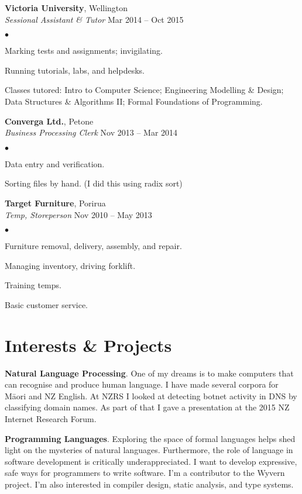 \documentclass[margin,line]{res}
\newenvironment{list2}{
  \begin{list}{$\bullet$}{%
      \setlength{\itemsep}{0in}
      \setlength{\parsep}{0in} \setlength{\parskip}{0in}
      \setlength{\topsep}{0in} \setlength{\partopsep}{0in}
      \setlength{\leftmargin}{0.2in}}}
  {\end{list}}
\begin{document}
\begin{resume}
    {\bf Victoria University}, Wellington\\
    {\em Sessional Assistant \& Tutor} \hfill {Mar 2014 -- Oct 2015}
    \begin{list2}
	\item Marking tests and assignments; invigilating.
	\item Running tutorials, labs, and helpdesks.
	\item Classes tutored: Intro to Computer Science; Engineering Modelling \& Design; Data Structures \& Algorithms II; Formal Foundations of Programming.
    \end{list2}

  {\bf Converga Ltd.}, Petone\\
  {\em Business Processing Clerk} \hfill {Nov 2013 -- Mar 2014}
  \begin{list2} %
	\item Data entry and verification.
	\item Sorting files by hand. (I did this using radix sort)
  \end{list2}

  {\bf Target Furniture}, Porirua\\
  {\em Temp, Storeperson} \hfill{Nov 2010 -- May 2013}
  \begin{list2} %
	\item Furniture removal, delivery, assembly, and repair. 
	\item Managing inventory, driving forklift.
	\item Training temps.
	\item Basic customer service.
  \end{list2}


\section{\sc Interests \& Projects}

{\bf Natural Language Processing}. One of my dreams is to make computers that can recognise and produce human language. I have made several corpora for M\=aori and NZ English. At NZRS I looked at detecting botnet activity in DNS by classifying domain names. As part of that I gave a presentation at the 2015 NZ Internet Research Forum.

{\bf Programming Languages}. Exploring the space of formal languages helps shed light on the mysteries of natural languages. Furthermore, the role of language in software development is critically underappreciated. I want to develop expressive, safe ways for programmers to write software. I'm a contributor to the Wyvern project. I'm also interested in compiler design, static analysis, and type systems.


\end{resume}
\end{document}
